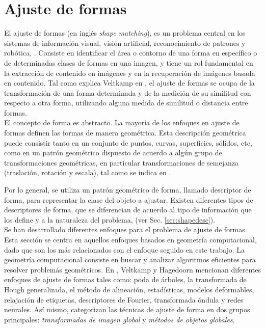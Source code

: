 \section{Ajuste de formas}
\label{sec:shapefitting}

El ajuste de formas (en ingl\'es \emph{shape matching}), es un problema
central en los sistemas de informaci\'on visual, visi\'on artificial, 
reconocimiento de patrones y rob\'otica, \cite{matchingbook}. Consiste
en identificar el \'area o contorno de una forma en espec\'ifico o de determinadas 
clases de formas en una imagen, y tiene un rol fundamental en la extracci\'on
de contenido en im\'agenes y en la recuperaci\'on de im\'agenes basada en contenido.
Tal como explica Veltkamp en \cite{matching2}, el ajuste de formas 
se ocupa de la transformaci\'on de una forma determinada y de la
medici\'on de su similitud con respecto a otra forma, utilizando
alguna medida de similitud o distancia entre formas.\\

El concepto de forma es abstracto. La mayor\'ia de los
enfoques en ajuste de formas definen las formas de manera 
geom\'etrica. Esta descripci\'on geom\'etrica puede 
consistir tanto en un conjunto de puntos, curvas, superficies,
s\'olidos, etc, como en un patr\'on geom\'etrico dispuesto de acuerdo
a alg\'un grupo de transformaciones geom\'etricas, en particular transformaciones
de semejanza (traslaci\'on, rotaci\'on y escala), tal como se indica en
\cite{matching2}. 

Por lo general, se utiliza un patr\'on geom\'etrico de forma, llamado
descriptor de forma, para representar la clase del objeto a ajustar.
Existen diferentes tipos de descriptores de forma, que se diferencian de acuerdo
al tipo de informaci\'on que los define y a la naturaleza del problema, (ver
Sec. \ref{sec:shapedesc}).\\

Se han desarrollado diferentes enfoques para el problema de ajuste de formas.
Esta secci\'on se centra en aquellos enfoques basados en geometr\'ia
computacional, dado que son los m\'as relacionados con el enfoque
seguido en este trabajo. La geometr\'ia computacional consiste en buscar y 
analizar algoritmos eficientes para resolver problem\'as geom\'etricos.
En \cite{matchingbook}, Veltkamp y Hagedoorn mencionan diferentes
enfoques de ajuste de formas tales como: poda de \'arboles, la transformada
de Hough generalizada, el m\'etodo de alineaci\'on, estad\'isticas,
modelos deformables, relajaci\'on de etiquetas, descriptores de Fourier,
transformada \'ondula y redes neurales. As\'i mismo, categorizan las 
t\'ecnicas de ajuste de forma en dos grupos principales:
\emph{transformadas de imagen global} y \emph{m\'etodos de objetos globales}.\\

